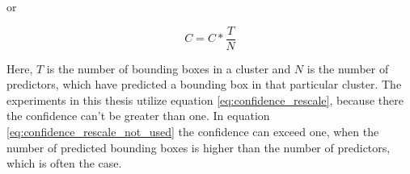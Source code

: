 \begin{enumerate}
    or

    \begin{equation}
        C = C * \frac{T}{N}
        \label{eq:confidence_rescale_not_used}
    \end{equation}

    Here, $T$ is the number of bounding boxes in a cluster and $N$ is the number of predictors, which have predicted a bounding box in that particular cluster.
    The experiments in this thesis utilize equation \ref{eq:confidence_rescale}, because there the confidence can't be greater than one.
    In equation \ref{eq:confidence_rescale_not_used} the confidence can exceed one,  when the number of predicted bounding boxes is higher than the number of predictors, which is often the case.
\end{enumerate}
